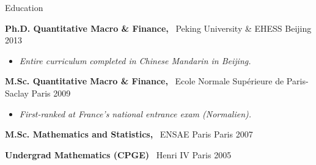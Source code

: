 \documentclass[usegeometry, 10pt, a4paper]{cv} %
\newcommand{\activite}[1]{\textbf{#1}\ }
\begin{document}
\begin{rubriquetableau}[0.95\textwidth]{Education}\\
  \vspace{-0.5cm}
  
  \activite{Ph.D. Quantitative Macro \& Finance,} Peking University \& EHESS \hfill Beijing 2013\\ 
\vspace{-0.5cm}  
  \begin{itemize}[label={},
    rightmargin=\dimexpr\linewidth-13cm-\leftmargin\relax]
  \item \small{\emph{Entire curriculum completed in Chinese Mandarin in Beijing.}}
  \end{itemize}
  
  \vspace{0.2cm}
  
  \activite{M.Sc. Quantitative Macro \& Finance,} Ecole Normale Supérieure de Paris-Saclay \hfill Paris 2009\\
  \vspace{-0.5cm}
  \begin{itemize}[label={}, rightmargin=\dimexpr\linewidth-13cm-\leftmargin\relax]
  \item \small{\emph{First-ranked at France's national entrance exam (Normalien).}}
  \end{itemize}

  \vspace{0.2cm}


  \activite{M.Sc. Mathematics and Statistics,} ENSAE Paris \hfill Paris 2007\\
  \vspace{0.2cm}

  \activite{Undergrad Mathematics (CPGE)} Henri IV \hfill Paris 2005\\
  \end{rubriquetableau}

\newpage

\end{document}
